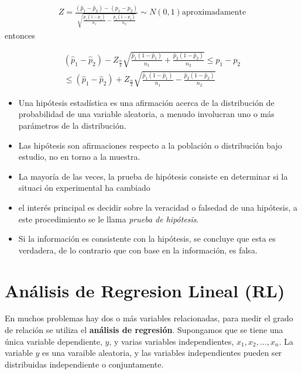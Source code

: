 \begin{itemize}
\begin{enumerate}
\begin{eqnarray*}
Z=\frac{\left(\hat{p}_{1}-\hat{p}_{2}\right)-\left(p_{1}-p_{2}\right)}{\sqrt{\frac{p_{1}\left(1-p_{1}\right)}{n_{1}}-\frac{p_{2}\left(1-p_{2}\right)}{n_{2}}}}\sim N\left(0,1\right)\textrm{aproximadamente}
\end{eqnarray*}
entonces

\begin{eqnarray*}
\left(\hat{p}_{1}-\hat{p}_{2}\right)-Z_{\frac{\alpha}{2}}\sqrt{\frac{\hat{p}_{1}\left(1-\hat{p}_{1}\right)}{n_{1}}+\frac{\hat{p}_{2}\left(1-\hat{p}_{2}\right)}{n_{2}}}\leq p_{1}-p_{2}\\
\leq\left(\hat{p}_{1}-\hat{p}_{2}\right)+Z_{\frac{\alpha}{2}}\sqrt{\frac{\hat{p}_{1}\left(1-\hat{p}_{1}\right)}{n_{1}}-\frac{\hat{p}_{2}\left(1-\hat{p}_{2}\right)}{n_{2}}}
\end{eqnarray*}

\begin{itemize}
\item Una hip\'otesis estad\'istica es una afirmaci\'on  acerca de la distribuci\'on de probabilidad de una variable aleatoria, a menudo involucran uno o m\'as par\'ametros de la distribuci\'on.

\item Las hip\'otesis son afirmaciones respecto a la poblaci\'on o distribuci\'on bajo estudio, no en torno a la muestra.

\item La mayor\'ia de las veces, la prueba de hip\'otesis consiste en determinar si la situaci \'on experimental ha cambiado

\item el inter\'es principal es decidir sobre la veracidad o falsedad de una hip\'otesis, a este procedimiento se le llama \textit{prueba de hip\'otesis}.

\item Si la informaci\'on es consistente con la hip\'otesis, se concluye que esta es verdadera, de lo contrario que con base en la informaci\'on, es falsa.

\end{itemize}

\section{An\'alisis de Regresion Lineal (RL)}

En muchos problemas hay dos o m\'as variables relacionadas, para medir el grado de relaci\'on se utiliza el \textbf{an\'alisis de regresi\'on}.  Supongamos que se tiene una \'unica variable dependiente, $y$, y varias  variables independientes, $x_{1},x_{2},\ldots,x_{n}$. La variable $y$ es una varaible aleatoria, y las variables independientes pueden ser distribuidas independiente o conjuntamente. 


\end{enumerate}
\end{itemize}
